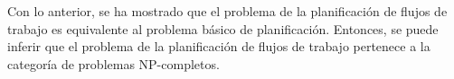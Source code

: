 Con lo anterior, se ha mostrado que el problema de la planificación de flujos de trabajo es equivalente al problema básico de planificación. Entonces, se puede inferir que el problema de la planificación de flujos de trabajo pertenece a la categoría de problemas NP-completos.


